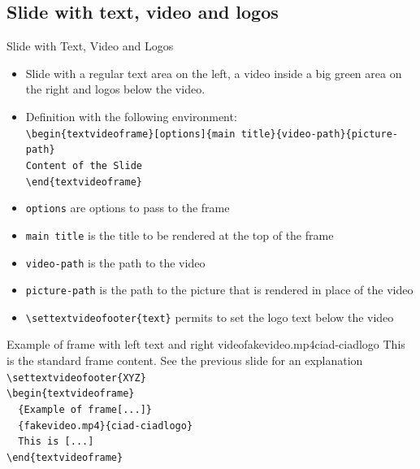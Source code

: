 \documentclass[english,sectioncirclenumberstyle]{ciadbeamer}
\begin{document}
\subsection{Slide with text, video and logos}
\subsectiontableofcontentslide

\begin{frame}{Slide with Text, Video and Logos}
	\begin{itemize}
		\item Slide with a regular text area on the left, a video inside a big green area on the right and logos below the video.
		\item Definition with the following environment: \\
		\texttt{{\textbackslash}begin\{textvideoframe\}[options]\{main title\}\{video-path\}\{picture-path\}} \\
		\texttt{Content of the Slide} \\
		\texttt{{\textbackslash}end\{textvideoframe\}}
		\item \texttt{options} are options to pass to the frame
		\item \texttt{main title} is the title to be rendered at the top of the frame
		\item \texttt{video-path} is the path to the video
		\item \texttt{picture-path} is the path to the picture that is rendered in place of the video
		\item \texttt{{\textbackslash}settextvideofooter\{text\}} permits to set the logo text below the video
	\end{itemize}
\end{frame}

\begin{textvideoframe}{{Example of frame} with left text and right video}{fakevideo.mp4}{ciad-ciadlogo}
	This is the standard frame content. See the previous slide for an explanation \\[.5cm]
	\texttt{{\textbackslash}settextvideofooter\{XYZ\}} \\[.5cm]
	\texttt{{\textbackslash}begin\{textvideoframe\}} \\
	\texttt{~~\{Example of frame[...]\}} \\
	\texttt{~~\{fakevideo.mp4\}\{ciad-ciadlogo\}} \\
	\texttt{~~This is [...]} \\
	\texttt{{\textbackslash}end\{textvideoframe\}}
\end{textvideoframe}
\end{document}
